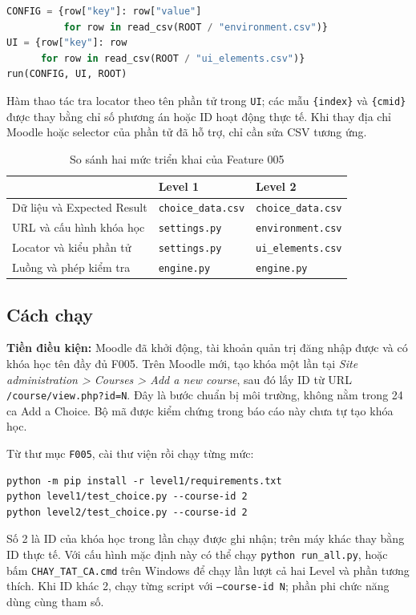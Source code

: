 \documentclass[12pt,a4paper]{article}
\begin{document}
\begin{lstlisting}[language=Python]
CONFIG = {row["key"]: row["value"]
          for row in read_csv(ROOT / "environment.csv")}
UI = {row["key"]: row
      for row in read_csv(ROOT / "ui_elements.csv")}
run(CONFIG, UI, ROOT)
\end{lstlisting}

Hàm thao tác tra locator theo tên phần tử trong \texttt{UI}; các mẫu
\texttt{\{index\}} và \texttt{\{cmid\}} được thay bằng chỉ số phương án hoặc ID hoạt động thực tế.
Khi thay địa chỉ Moodle hoặc selector của phần tử đã hỗ trợ, chỉ cần sửa CSV tương ứng.

\begin{table}[H]
\centering\small
\begin{tabular}{|L{4.0cm}|L{4.8cm}|L{5.0cm}|}
\hline
{} & \textbf{Level 1} & \textbf{Level 2} \\ \hline
Dữ liệu và Expected Result & \texttt{choice\_data.csv} & \texttt{choice\_data.csv} \\ \hline
URL và cấu hình khóa học & \texttt{settings.py} & \texttt{environment.csv} \\ \hline
Locator và kiểu phần tử & \texttt{settings.py} & \texttt{ui\_elements.csv} \\ \hline
Luồng và phép kiểm tra & \texttt{engine.py} & \texttt{engine.py} \\ \hline
\end{tabular}
\caption{So sánh hai mức triển khai của Feature 005}
\end{table}

\subsection{Cách chạy}
\textbf{Tiền điều kiện:} Moodle đã khởi động, tài khoản quản trị đăng nhập được và có khóa học
tên đầy đủ F005. Trên Moodle mới, tạo khóa một lần tại
\emph{Site administration > Courses > Add a new course}, sau đó lấy ID từ URL
\texttt{/course/view.php?id=N}. Đây là bước chuẩn bị môi trường, không nằm trong 24 ca Add a Choice.
Bộ mã được kiểm chứng trong báo cáo này chưa tự tạo khóa học.

Từ thư mục \texttt{F005}, cài thư viện rồi chạy từng mức:
\begin{lstlisting}
python -m pip install -r level1/requirements.txt
python level1/test_choice.py --course-id 2
python level2/test_choice.py --course-id 2
\end{lstlisting}
Số 2 là ID của khóa học trong lần chạy được ghi nhận; trên máy khác thay bằng ID thực tế.
Với cấu hình mặc định này có thể chạy \texttt{python run\_all.py}, hoặc bấm
\texttt{CHAY\_TAT\_CA.cmd} trên Windows để chạy lần lượt cả hai Level và phần tương thích.
Khi ID khác 2, chạy từng script với \texttt{--course-id N}; phần phi chức năng dùng cùng tham số.
\end{document}
